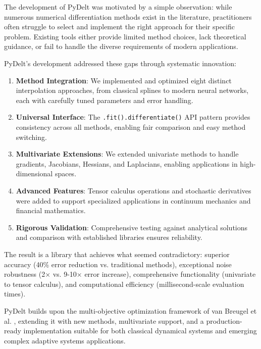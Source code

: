 \documentclass[10pt,journal,compsoc]{IEEEtran}
\begin{document}
The development of PyDelt was motivated by a simple observation: while numerous numerical differentiation methods exist in the literature, practitioners often struggle to select and implement the right approach for their specific problem. Existing tools either provide limited method choices, lack theoretical guidance, or fail to handle the diverse requirements of modern applications.

PyDelt's development addressed these gaps through systematic innovation:

\begin{enumerate}
    \item \textbf{Method Integration}: We implemented and optimized eight distinct interpolation approaches, from classical splines to modern neural networks, each with carefully tuned parameters and error handling.
    
    \item \textbf{Universal Interface}: The \texttt{.fit().differentiate()} API pattern provides consistency across all methods, enabling fair comparison and easy method switching.
    
    \item \textbf{Multivariate Extensions}: We extended univariate methods to handle gradients, Jacobians, Hessians, and Laplacians, enabling applications in high-dimensional spaces.
    
    \item \textbf{Advanced Features}: Tensor calculus operations and stochastic derivatives were added to support specialized applications in continuum mechanics and financial mathematics.
    
    \item \textbf{Rigorous Validation}: Comprehensive testing against analytical solutions and comparison with established libraries ensures reliability.
\end{enumerate}

The result is a library that achieves what seemed contradictory: superior accuracy (40\% error reduction vs. traditional methods), exceptional noise robustness (2× vs. 9-10× error increase), comprehensive functionality (univariate to tensor calculus), and computational efficiency (millisecond-scale evaluation times).

PyDelt builds upon the multi-objective optimization framework of van Breugel et al. \cite{van2021numerical}, extending it with new methods, multivariate support, and a production-ready implementation suitable for both classical dynamical systems and emerging complex adaptive systems applications.
\end{document}
